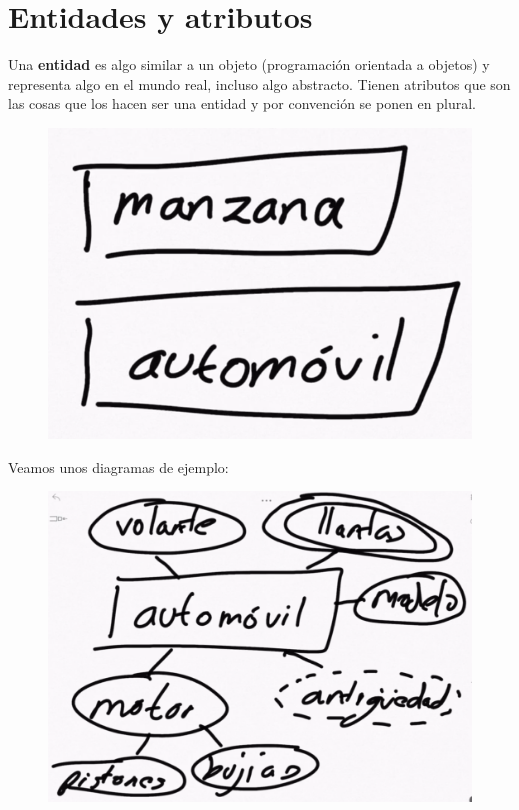 \documentclass{article}
\begin{document}
\section{Entidades y atributos}%
Una \textbf{entidad} es algo similar a un objeto (programación orientada a
objetos) y representa algo en el mundo real, incluso algo abstracto. Tienen
atributos que son las cosas que los hacen ser una entidad y por convención se
ponen en plural.

\begin{figure}[h!]
    \centering
      \includegraphics[scale=0.5]{./Pictures/001_entidades.png}
\end{figure}

\newpage
Veamos unos diagramas de ejemplo:
\begin{figure}[h!]
    \centering
      \includegraphics[scale=0.5]{./Pictures/002_Diagrama.png}
\end{figure}
\end{document}
